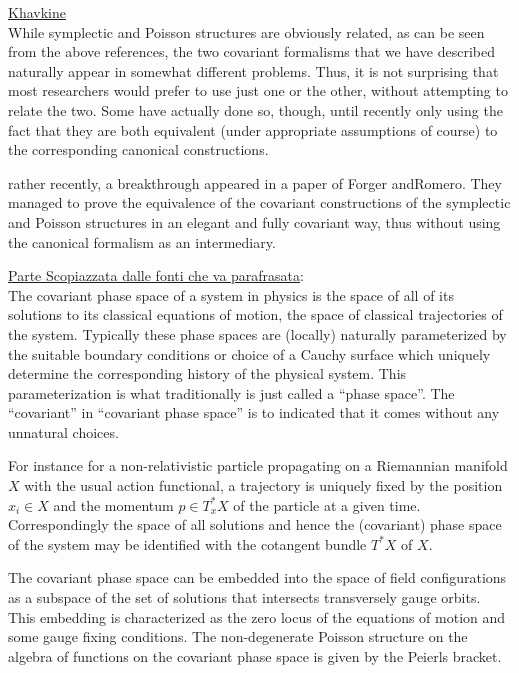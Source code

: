 \documentclass[Main]{subfiles}
\begin{document}
		\begin{Warning}
			\underline{Khavkine}\cite{Khavkine2014}\\
			While symplectic and Poisson structures are obviously related, as can be seen from the above references, the two covariant formalisms that we have described naturally appear in somewhat different problems. 
			Thus, it is not surprising that most researchers would prefer to use just one or the other, without attempting to relate the two.
			 Some have actually done so, though, until recently only using the fact that they are both equivalent (under appropriate assumptions of course) to the corresponding canonical constructions.
			 
			 rather recently, a breakthrough appeared in a paper of Forger andRomero. They managed to prove the equivalence of the covariant constructions of the symplectic and Poisson structures in an elegant and fully covariant way, thus without using the canonical formalism as an intermediary.

		\end{Warning}		
		
		\begin{Warning}
			\underline{Parte Scopiazzata dalle fonti che va parafrasata}:\\

			The covariant phase space of a system in physics is the space of all of its solutions to its classical equations of motion, the space of classical trajectories of the system. 
			Typically these phase spaces are (locally) naturally parameterized by the suitable boundary conditions or choice of a Cauchy surface which uniquely determine the corresponding history of the physical system. This parameterization is what traditionally is just called a “phase space”. 
			The “covariant” in “covariant phase space” is to indicated that it comes without any unnatural choices.
	
			For instance for a non-relativistic particle propagating on a Riemannian manifold $X$ with the usual action functional, a trajectory is uniquely fixed by the position $x_i \in X$ and the momentum $p\in T^*_x X$ of the particle at a given time. 
			Correspondingly the space of all solutions and hence the (covariant) phase space of the system may be identified with the cotangent bundle $T^*X$ of $X$.

 			The covariant phase space can be embedded into the space of field configurations as a subspace of the set of solutions that intersects transversely gauge orbits.  
			This embedding is characterized as the zero locus of the equations of motion and some gauge fixing conditions. The non-degenerate Poisson structure on the algebra of functions on the covariant phase space is given by the Peierls bracket.
		\end{Warning}
\end{document}
